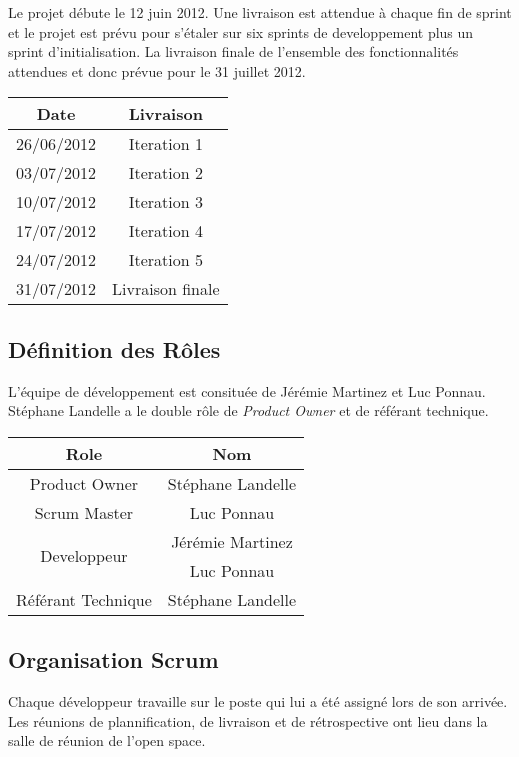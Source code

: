 \documentclass[11pt]{article}
\begin{document}
Le projet débute le 12 juin 2012. Une livraison est attendue à chaque fin de
sprint et le projet est prévu pour s'étaler sur six sprints de developpement
plus un sprint d'initialisation. La livraison finale de l'ensemble des
fonctionnalités attendues et donc prévue pour le 31 juillet 2012.

\begin{center}
\begin{tabular}{ | c | c | }
\hline \textbf{Date} & \textbf{Livraison} \\
\hline 26/06/2012 & Iteration 1 \\
\hline 03/07/2012 & Iteration 2 \\
\hline 10/07/2012 & Iteration 3 \\
\hline 17/07/2012 & Iteration 4 \\
\hline 24/07/2012 & Iteration 5 \\
\hline 31/07/2012 & Livraison finale \\ \hline
\end{tabular}
\end{center}

\subsection{Définition des Rôles}

L'équipe de développement est consituée de Jérémie Martinez et Luc Ponnau.
Stéphane Landelle a le double rôle de \emph{Product Owner} et de référant 
technique.

\begin{center}
\begin{tabular}{ | c | c | }
\hline \textbf{Role} & \textbf{Nom} \\
\hline Product Owner & Stéphane Landelle \\
\hline Scrum Master & Luc Ponnau \\
\hline \multirow{2}{*}{Developpeur} & Jérémie Martinez \\ & Luc Ponnau \\
\hline Référant Technique & Stéphane Landelle \\ \hline
\end{tabular}
\end{center}

\subsection{Organisation Scrum}

Chaque développeur travaille sur le poste qui lui a été assigné lors de son
arrivée. Les réunions de plannification, de livraison et de rétrospective
ont lieu dans la salle de réunion de l'open space.\\
\end{document}
